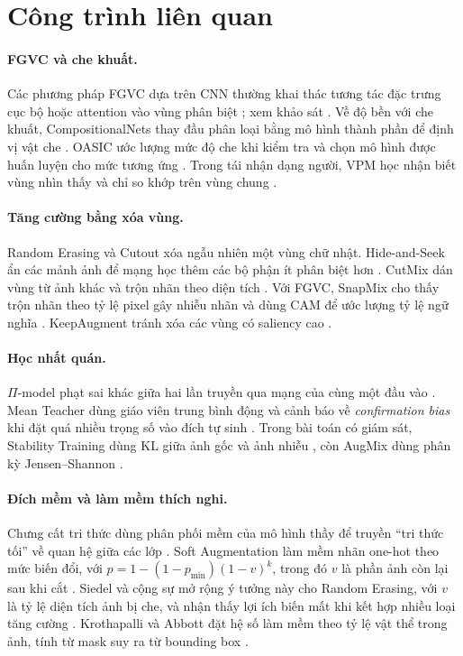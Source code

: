 \documentclass[11pt,a4paper]{article}
\theoremstyle{plain}
\theoremstyle{definition}
\theoremstyle{remark}
\begin{document}
\section{Công trình liên quan}
\label{sec:related}

\paragraph{FGVC và che khuất.} Các phương pháp FGVC dựa trên CNN thường khai thác tương tác đặc trưng cục bộ \cite{lin2015bilinear} hoặc attention vào vùng phân biệt \cite{fu2017look}; xem khảo sát \cite{wei2022fgia}. Về độ bền với che khuất, CompositionalNets thay đầu phân loại bằng mô hình thành phần để định vị vật che \cite{kortylewski2020compositional}. OASIC ước lượng mức độ che khi kiểm tra và chọn mô hình được huấn luyện cho mức tương ứng \cite{gijzen2026oasic}. Trong tái nhận dạng người, VPM học nhận biết vùng nhìn thấy và chỉ so khớp trên vùng chung \cite{sun2019vpm}.

\paragraph{Tăng cường bằng xóa vùng.} Random Erasing \cite{zhong2020random} và Cutout \cite{devries2017cutout} xóa ngẫu nhiên một vùng chữ nhật. Hide-and-Seek ẩn các mảnh ảnh để mạng học thêm các bộ phận ít phân biệt hơn \cite{singh2017hide}. CutMix dán vùng từ ảnh khác và trộn nhãn theo diện tích \cite{yun2019cutmix}. Với FGVC, SnapMix cho thấy trộn nhãn theo tỷ lệ pixel gây nhiễu nhãn và dùng CAM để ước lượng tỷ lệ ngữ nghĩa \cite{huang2021snapmix}. KeepAugment tránh xóa các vùng có saliency cao \cite{gong2021keepaugment}.

\paragraph{Học nhất quán.} $\Pi$-model phạt sai khác giữa hai lần truyền qua mạng của cùng một đầu vào \cite{laine2017temporal}. Mean Teacher dùng giáo viên trung bình động và cảnh báo về \emph{confirmation bias} khi đặt quá nhiều trọng số vào đích tự sinh \cite{tarvainen2017mean}. Trong bài toán có giám sát, Stability Training dùng KL giữa ảnh gốc và ảnh nhiễu \cite{zheng2016stability}, còn AugMix dùng phân kỳ Jensen--Shannon \cite{hendrycks2020augmix}.

\paragraph{Đích mềm và làm mềm thích nghi.} Chưng cất tri thức dùng phân phối mềm của mô hình thầy để truyền ``tri thức tối'' về quan hệ giữa các lớp \cite{hinton2015distilling}. Soft Augmentation làm mềm nhãn one-hot theo mức biến đổi, với $p = 1-(1-p_{\min})(1-v)^k$, trong đó $v$ là phần ảnh còn lại sau khi cắt \cite{liu2023soft}. Siedel và cộng sự mở rộng ý tưởng này cho Random Erasing, với $v$ là tỷ lệ diện tích ảnh bị che, và nhận thấy lợi ích biến mất khi kết hợp nhiều loại tăng cường \cite{siedel2026combined}. Krothapalli và Abbott đặt hệ số làm mềm theo tỷ lệ vật thể trong ảnh, tính từ mask suy ra từ bounding box \cite{krothapalli2020adaptive}.
\end{document}
